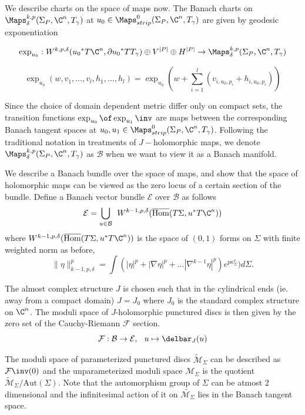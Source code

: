 We describe charts on the space of maps now. The Banach charts on $\Maps^{k,p}_\delta(\Sigma_P, \C^n , T_\gamma)$ at $u_0 \in \Maps^0_{strip}(\Sigma_P, \C^n , T_\gamma)$  are given by geodesic exponentiation 

\begin{equation}\label{eq:chartbanach}
    \exp_{u_0} :  W^{k,p,\delta}({u_0}^* T\C^n,\partial {u_0}^* TT_\gamma) \oplus V^{|P|} \oplus H^{|P|}  \to \Maps^{k,p}_\delta(\Sigma_P, \C^n , T_\gamma)
\end{equation}

\begin{equation*}
    \exp_{u_0} (w,v_1,\dots,v_l,h_1,\dots,h_l) =  \exp_{u_0}(w + \sum_{i=1}^l(v_{i,u_0,p_i} + h_{i,u_0,p_i}))
\end{equation*}


\noindent Since the choice of domain dependent metric differ only on compact sets, the transition functions
$\exp_{u_0} \of \exp_{u_1} \inv$ are maps between the corresponding Banach tangent spaces at $u_0,u_1 \in \Maps^0_{strip}(\Sigma_P, \C^n , T_\gamma)$. Following the traditional notation in treatments of $J-$holomorphic maps, we denote $\Maps^{k,p}_\delta(\Sigma_P, \C^n , T_\gamma)$ as $\mathcal{B}$ when we want to view it as a Banach manifold.

We describe a Banach bundle over the space of maps, and show that the space of holomorphic maps can be viewed as the zero locus of a certain section of the bundle. Define a Banach vector bundle  $\mathcal{E} $ over $\mathcal{B}$ as follows $$\mathcal{E} = \bigcup _{u\in \mathcal{B}} \,\; W^{k-1,p,\delta}(\overline{\operatorname{Hom}}(T\Sigma,u^*T\C^n))    $$
where $W^{k-1,p,\delta}(\overline{\operatorname{Hom}}(T\Sigma,u^*T\C^n))$ is the space of $(0,1)$ forms on $\Sigma$ with finite weighted  norm as before, 
$$\| \eta \|_{k-1,p,\delta}^p = \int (|\eta|^p + |\nabla \eta |^p  + \dots |\nabla^{k-1} \eta|^p)e^{p\kappa^\delta_\Sigma}  ) d\Sigma.$$

\noindent The almost complex structure $J$ is chosen such that in the cylindrical ends (ie. away from a compact domain) $J = J_0$ where $J_0$ is the standard complex structure on $\C^n$. The moduli space of $J$-holomorphic punctured discs is then given by the zero set of the Cauchy-Riemann $\mathcal{F}$ section. $$\mathcal{F}: \mathcal{B} \to \mathcal{E},\; \,\; u\mapsto \delbar_J(u)$$ 

\noindent The moduli space of parameterized punctured discs  $\widetilde{\mathcal{M}}_\Sigma$ can be described as $\mathcal{F}\inv (0)$ and the unparameterized moduli space $\mathcal{M}_\Sigma$ is the quotient $\widetilde{\mathcal{M}}_\Sigma/\text{Aut}(\Sigma)$. Note that the automorphism group of $\Sigma$ can be atmost 2 dimensional and the infinitesimal action of it on $\widetilde{\mathcal{M}_\Sigma}$ lies in the Banach tangent space.

